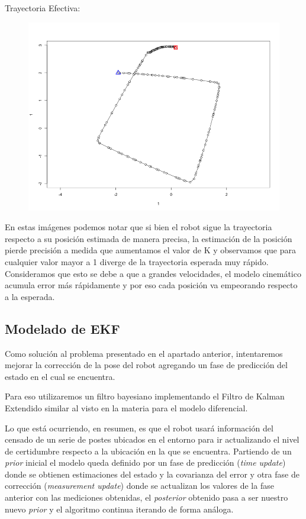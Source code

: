 Trayectoria Efectiva:

\begin{figure}[!htb]
\begin{center}
\includegraphics[width=\linewidth/2]{imagenesTrayectorias/lazocerrado/lazocerrado4.png}
\end{center}
\end{figure}
\FloatBarrier

En estas imágenes podemos notar que si bien el robot sigue la trayectoria respecto a su posición estimada de manera precisa, la estimación de la posición pierde precisión a medida que aumentamos el valor de K y observamos que para cualquier valor mayor a 1 diverge de la trayectoria esperada muy rápido. Consideramos que esto se debe a que a grandes velocidades, el modelo cinemático acumula error más rápidamente y por eso cada posición va empeorando respecto a la esperada.

\subsection{Modelado de EKF}

Como solución al problema presentado en el apartado anterior, intentaremos mejorar la corrección de la pose del robot agregando un fase de predicción del estado en el cual se encuentra.

Para eso utilizaremos un filtro bayesiano implementando el Filtro de Kalman Extendido similar al visto en la materia para el modelo diferencial.

Lo que está ocurriendo, en resumen, es que el robot usará información del censado de un serie de postes ubicados en el entorno para ir actualizando el nivel de certidumbre respecto a la ubicación en la que se encuentra. Partiendo de un \textit{prior} inicial el modelo queda definido por un fase de predicción (\textit{time update}) donde se obtienen estimaciones del estado y la covarianza del error y otra fase de corrección (\textit{measurement update}) donde se actualizan los valores de la fase anterior con las mediciones obtenidas, el \textit{posterior} obtenido pasa a ser nuestro nuevo \textit{prior} y el algoritmo continua iterando de forma análoga.


